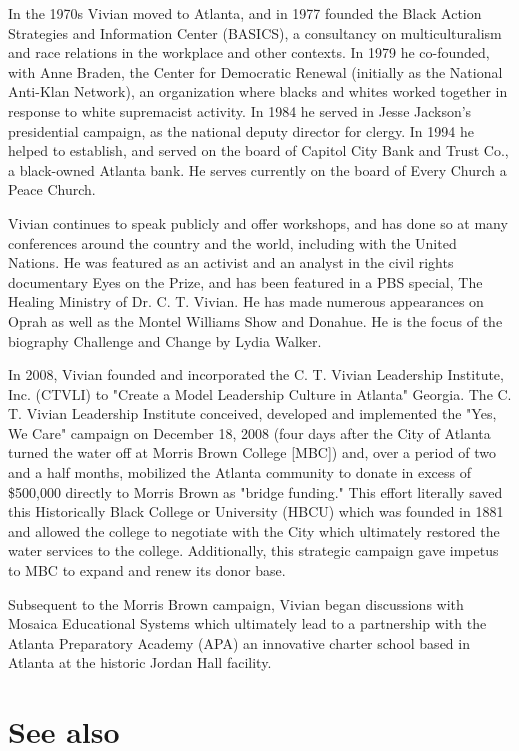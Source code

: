 In the 1970s Vivian moved to Atlanta, and in 1977 founded the Black
Action Strategies and Information Center (BASICS), a consultancy on
multiculturalism and race relations in the workplace and other contexts.
In 1979 he co-founded, with Anne Braden, the Center for Democratic
Renewal (initially as the National Anti-Klan Network), an organization
where blacks and whites worked together in response to white supremacist
activity. In 1984 he served in Jesse Jackson's presidential campaign, as
the national deputy director for clergy. In 1994 he helped to establish,
and served on the board of Capitol City Bank and Trust Co., a
black-owned Atlanta bank. He serves currently on the board of Every
Church a Peace Church.

Vivian continues to speak publicly and offer workshops, and has done so
at many conferences around the country and the world, including with the
United Nations. He was featured as an activist and an analyst in the
civil rights documentary Eyes on the Prize, and has been featured in a
PBS special, The Healing Ministry of Dr. C. T. Vivian. He has made
numerous appearances on Oprah as well as the Montel Williams Show and
Donahue. He is the focus of the biography Challenge and Change by Lydia
Walker.

In 2008, Vivian founded and incorporated the C. T. Vivian Leadership
Institute, Inc. (CTVLI) to "Create a Model Leadership Culture in
Atlanta" Georgia. The C. T. Vivian Leadership Institute conceived,
developed and implemented the "Yes, We Care" campaign on December 18,
2008 (four days after the City of Atlanta turned the water off at Morris
Brown College {[}MBC{]}) and, over a period of two and a half months,
mobilized the Atlanta community to donate in excess of \$500,000
directly to Morris Brown as "bridge funding." This effort literally
saved this Historically Black College or University (HBCU) which was
founded in 1881 and allowed the college to negotiate with the City which
ultimately restored the water services to the college. Additionally,
this strategic campaign gave impetus to MBC to expand and renew its
donor base.

Subsequent to the Morris Brown campaign, Vivian began discussions with
Mosaica Educational Systems which ultimately lead to a partnership with
the Atlanta Preparatory Academy (APA) an innovative charter school based
in Atlanta at the historic Jordan Hall facility.

\section{See also}\label{see-also}

